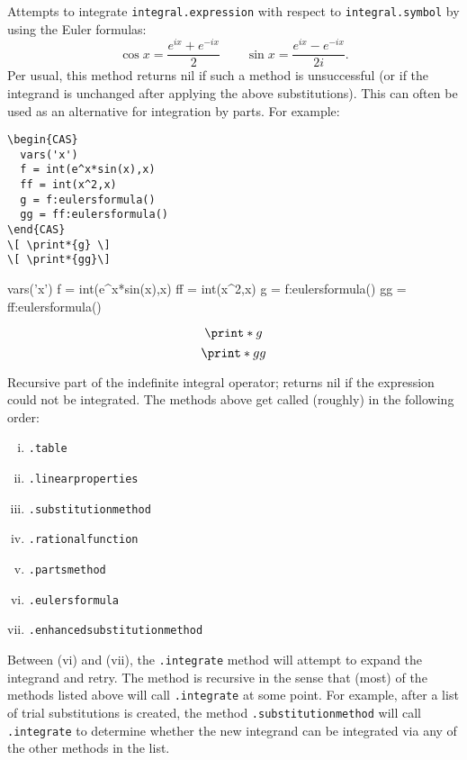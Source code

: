 
Attempts to integrate \texttt{integral.expression} with respect to \texttt{integral.symbol} by using the Euler formulas:
\[ \cos x = \frac{e^{ix} + e^{-ix}}{2} \qquad \sin x = \frac{e^{ix} - e^{-ix}}{2i}.\]
Per usual, this method returns nil if such a method is unsuccessful (or if the integrand is unchanged after applying the above substitutions). This can often be used as an alternative for integration by parts. For example:

\begin{codebox}
    \begin{verbatim}
\begin{CAS}
  vars('x')
  f = int(e^x*sin(x),x)
  ff = int(x^2,x)
  g = f:eulersformula()
  gg = ff:eulersformula()
\end{CAS}
\[ \print*{g} \]
\[ \print*{gg}\]
\end{verbatim}
\tcblower
\begin{CAS}
    vars('x')
    f = int(e^x*sin(x),x)
    ff = int(x^2,x)
    g = f:eulersformula()
    gg = ff:eulersformula()
\end{CAS}
\[ \print*{g} \]
\[ \print*{gg}\]
\end{codebox}


Recursive part of the indefinite integral operator; returns nil if the expression could not be integrated. The methods above get called (roughly) in the following order:
\begin{enumerate}[(i)]
    \item \texttt{.table}
    \item \texttt{.linearproperties}
    \item \texttt{.substitutionmethod}
    \item \texttt{.rationalfunction}
    \item \texttt{.partsmethod}
    \item \texttt{.eulersformula}
    \item \texttt{.enhancedsubstitutionmethod}
\end{enumerate}
Between (vi) and (vii), the \texttt{.integrate} method will attempt to expand the integrand and retry. The method is recursive in the sense that (most) of the methods listed above will call \texttt{.integrate} at some point. For example, after a list of trial substitutions is created, the method \texttt{.substitutionmethod} will call \texttt{.integrate} to determine whether the new integrand can be integrated via any of the other methods in the list.

